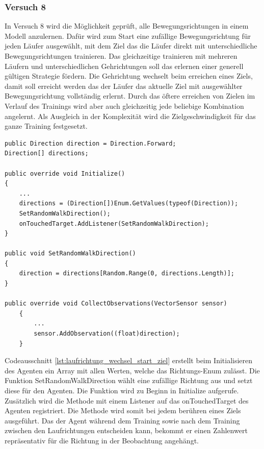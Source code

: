 \subsubsection{Versuch 8}
In Versuch 8 wird die Möglichkeit geprüft, alle Bewegungsrichtungen in einem Modell anzulernen. Dafür wird zum Start eine zufällige Bewegungsrichtung für jeden Läufer ausgewählt, mit dem Ziel das die Läufer direkt mit unterschiedliche Bewegungsrichtungen trainieren. Das gleichzeitige trainieren mit mehreren Läufern und unterschiedlichen Gehrichtungen soll das erlernen einer generell gültigen Strategie fördern. Die Gehrichtung wechselt beim erreichen eines Ziels, damit soll erreicht werden das der Läufer das aktuelle Ziel mit ausgewählter Bewegungsrichtung vollständig erlernt. Durch das öftere erreichen von Zielen im Verlauf des Trainings wird aber auch gleichzeitig jede beliebige Kombination angelernt. Als Ausgleich in der Komplexität wird die Zielgeschwindigkeit für das ganze Training festgesetzt.

\begin{lstlisting}[caption={Laufrichtung zufällig zum Start und beim erreichen von Ziel},captionpos=b,label={lst:laufrichtung_wechsel_start_ziel}]
public Direction direction = Direction.Forward;
Direction[] directions;

public override void Initialize()
{
    ...
    directions = (Direction[])Enum.GetValues(typeof(Direction));
    SetRandomWalkDirection();
    onTouchedTarget.AddListener(SetRandomWalkDirection);
}

public void SetRandomWalkDirection()
{
    direction = directions[Random.Range(0, directions.Length)];
}

public override void CollectObservations(VectorSensor sensor)
    {
        ...
        sensor.AddObservation((float)direction);
    }
\end{lstlisting}

Codeausschnitt \ref{lst:laufrichtung_wechsel_start_ziel} erstellt beim Initialisieren des Agenten ein Array mit allen Werten, welche das Richtungs-Enum zulässt. Die Funktion SetRandomWalkDirection wählt eine zufällige Richtung aus und setzt diese für den Agenten. Die Funktion wird zu Beginn in Initialize aufgerufe. Zusätzlich wird die Methode mit einem Listener auf das onTouchedTarget des Agenten registriert. Die Methode wird somit bei jedem berühren eines Ziels ausgeführt. Das der Agent während dem Training sowie nach dem Training zwischen den Laufrichtungen entscheiden kann, bekommt er einen Zahlenwert repräsentativ für die Richtung in der Beobachtung angehängt.

